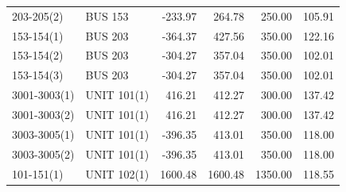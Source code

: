 \documentclass[10pt]{report}
\begin{document}
\begin{table}[H]
{\begin{tabular}{llrrrr}
203-205(2) & BUS 153 & -233.97 & 264.78 & 250.00 & 105.91 \\
153-154(1) & BUS 203 & -364.37 & 427.56 & 350.00 & 122.16 \\
153-154(2) & BUS 203 & -304.27 & 357.04 & 350.00 & 102.01 \\
153-154(3) & BUS 203 & -304.27 & 357.04 & 350.00 & 102.01 \\
3001-3003(1) & UNIT 101(1) & 416.21 & 412.27 & 300.00 & 137.42 \\
3001-3003(2) & UNIT 101(1) & 416.21 & 412.27 & 300.00 & 137.42 \\
3003-3005(1) & UNIT 101(1) & -396.35 & 413.01 & 350.00 & 118.00 \\
3003-3005(2) & UNIT 101(1) & -396.35 & 413.01 & 350.00 & 118.00 \\
101-151(1) & UNIT 102(1) & 1600.48 & 1600.48 & 1350.00 & 118.55 \\
\bottomrule
\end{tabular}}
\end{table}
\end{document}
